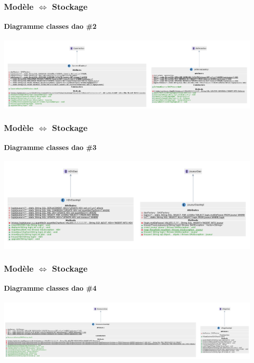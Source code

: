 \documentclass{beamer}
\begin{document}
    \begin{frame}
        \frametitle{Modèle $\Leftrightarrow$ Stockage}
        \framesubtitle{Diagramme classes dao \#2}
        \begin{center}
            \includegraphics[scale=0.15]{images/Classesdao2.png}
        \end{center}
    \end{frame}
    \begin{frame}
        \frametitle{Modèle $\Leftrightarrow$ Stockage}
        \framesubtitle{Diagramme classes dao \#3}
        \begin{center}
            \includegraphics[scale=0.15]{images/Classesdao3.png}
        \end{center}
    \end{frame}
    \begin{frame}
        \frametitle{Modèle $\Leftrightarrow$ Stockage}
        \framesubtitle{Diagramme classes dao \#4}
        \begin{center}
            \includegraphics[scale=0.15]{images/Classesdao4.png}
        \end{center}
    \end{frame}
\end{document}
